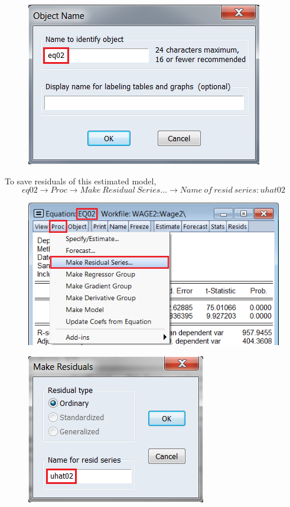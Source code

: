 \documentclass[12pt]{report}
\begin{document}
\vspace{-\baselineskip}
\begin{figure}[H]
	\centering
	\includegraphics{q3_24}
\end{figure}
\vspace{-\baselineskip}
\noindent To save residuals of this estimated model,
$$eq02 \to Proc \to Make\ Residual\ Series \dots \to Name\ of\ resid\ series: uhat02$$
\begin{figure}[H]
	\centering
	\includegraphics{q3_25}
\end{figure}
\vspace{-\baselineskip}
\begin{figure}[H]
	\centering
	\includegraphics{q3_26}
\end{figure}
\end{document}
